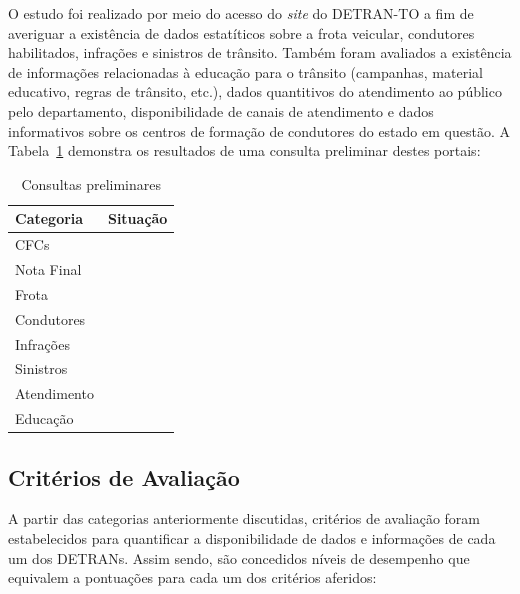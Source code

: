 \documentclass[
  a4paper,
]{article}
\begin{document}
O estudo foi realizado por meio do acesso do \emph{site} do DETRAN-TO a
fim de averiguar a existência de dados estatíticos sobre a frota
veicular, condutores habilitados, infrações e sinistros de trânsito.
Também foram avaliados a existência de informações relacionadas à
educação para o trânsito (campanhas, material educativo, regras de
trânsito, etc.), dados quantitivos do atendimento ao público pelo
departamento, disponibilidade de canais de atendimento e dados
informativos sobre os centros de formação de condutores do estado em
questão. A Tabela~\ref{tbl-consultas} demonstra os resultados de uma
consulta preliminar destes portais:

\begin{longtable}{lc}

\caption{\label{tbl-consultas}Consultas preliminares}

\tabularnewline

\toprule
Categoria & Situação \\ 
\midrule\addlinespace[2.5pt]
CFCs & \cellcolor[HTML]{1FA149}{\textcolor[HTML]{FFFFFF}{Presente}} \\ 
Nota Final & \cellcolor[HTML]{1FA149}{\textcolor[HTML]{FFFFFF}{Presente}} \\ 
Frota & \cellcolor[HTML]{D7191C}{\textcolor[HTML]{FFFFFF}{Ausente}} \\ 
Condutores & \cellcolor[HTML]{D7191C}{\textcolor[HTML]{FFFFFF}{Ausente}} \\ 
Infrações & \cellcolor[HTML]{D7191C}{\textcolor[HTML]{FFFFFF}{Ausente}} \\ 
Sinistros & \cellcolor[HTML]{D7191C}{\textcolor[HTML]{FFFFFF}{Ausente}} \\ 
Atendimento & \cellcolor[HTML]{1FA149}{\textcolor[HTML]{FFFFFF}{Presente}} \\ 
Educação & \cellcolor[HTML]{1FA149}{\textcolor[HTML]{FFFFFF}{Presente}} \\ 
\bottomrule

\end{longtable}

\subsection{Critérios de
Avaliação}\label{crituxe9rios-de-avaliauxe7uxe3o}

A partir das categorias anteriormente discutidas, critérios de avaliação
foram estabelecidos para quantificar a disponibilidade de dados e
informações de cada um dos DETRANs. Assim sendo, são concedidos níveis
de desempenho que equivalem a pontuações para cada um dos critérios
aferidos:
\end{document}
